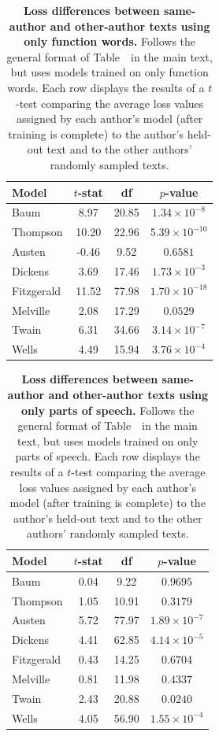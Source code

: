 \documentclass[10pt]{article}
\providecommand{\DIFaddbeginFL}{} %
\newcommand{\DIFaddincludegraphics}[2][]{{\color{blue}\fbox{\DIFOincludegraphics[#1]{#2}}}} %
\DeclareRobustCommand{\DIFaddbeginFL}{\DIFOaddbeginFL \let\includegraphics\DIFaddincludegraphics} %
\begin{document}
\begin{table}[h]
\centering
\small
\begin{tabular}{lccc}
\hline
\textbf{Model} & \textbf{$t$-stat} & \textbf{df} & \textbf{$p$-value}\\
\hline
Baum         & 8.97 & 20.85 & $1.34 \times 10^{-8}$  \\
Thompson     & 10.20 & 22.96 & $5.39 \times 10^{-10}$  \\
Austen       & -0.46 & 9.52 & $0.6581$  \\
Dickens      & 3.69 & 17.46 & $1.73 \times 10^{-3}$  \\
Fitzgerald   & 11.52 & 77.98 & $1.70 \times 10^{-18}$  \\
Melville     & 2.08 & 17.29 & $0.0529$  \\
Twain        & 6.31 & 34.66 & $3.14 \times 10^{-7}$  \\
Wells        & 4.49 & 15.94 & $3.76 \times 10^{-4}$  \\
\hline
\end{tabular}

\caption{\textbf{Loss differences between same-author and other-author texts
using only function words.} Follows the general format of Table~\authortable~in
the main text, but uses models trained on only function words. Each row displays
the results of a $t$-test comparing the average loss values assigned by each
author's model (after training is complete) to the author's held-out text and
to the other authors' randomly sampled texts.}

\label{tab:t-tests-function}
\end{table}

\begin{table}[h]
\centering
\small
\begin{tabular}{lccc}
\hline
\textbf{Model} & \textbf{$t$-stat} & \textbf{df} & \textbf{$p$-value}\\
\hline
Baum         & 0.04 & 9.22 & $0.9695$  \\
Thompson     & 1.05 & 10.91 & $0.3179$  \\
Austen       & 5.72 & 77.97 & $1.89 \times 10^{-7}$  \\
Dickens      & 4.41 & 62.85 & $4.14 \times 10^{-5}$  \\
Fitzgerald   & 0.43 & 14.25 & $0.6704$  \\
Melville     & 0.81 & 11.98 & $0.4337$  \\
Twain        & 2.43 & 20.88 & $0.0240$  \\
Wells        & 4.05 & 56.90 & $1.55 \times 10^{-4}$  \\
\hline
\end{tabular}

\caption{\textbf{Loss differences between same-author and other-author texts
using only parts of speech.} Follows the general format of Table~\authortable~in
the main text, but uses models trained on only parts of speech. Each row displays
the results of a $t$-test comparing the average loss values assigned by each
author's model (after training is complete) to the author's held-out text and
to the other authors' randomly sampled texts.}

\label{tab:t-tests-pos}
\DIFaddbeginFL \end{table}
\end{document}

